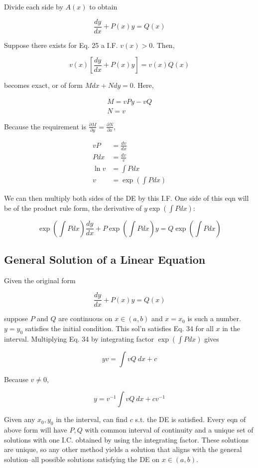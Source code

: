Divide each side by $A(x)$ to obtain

\begin{equation}
    \frac{dy}{dx}+P(x)y=Q(x)
\end{equation}

Suppose there exists for Eq. 25 a I.F. $v(x)>0$. Then,

\begin{equation}
    v(x)\left[\frac{dy}{dx}+P(x)y\right]=v(x)Q(x)
\end{equation}

becomes exact, or of form $Mdx+Ndy=0$. Here,

\begin{eqnarray}
    M=vPy-vQ\\
    N=v
\end{eqnarray}

Because the requirement is $\frac{\partial M}{\partial y}=\frac{\partial N}{\partial x}$,

\begin{align}
    vP&=\frac{dv}{dx}\\
    Pdx&=\frac{dv}{v}\\
    \ln v&=\int Pdx\\
    v&=\exp(\int Pdx)
\end{align}

We can then multiply both sides of the DE by this I.F. One side of this eqn will be of the product rule form, the derivative of $y\exp (\int Pdx)$:

\begin{equation}
    \exp(\int Pdx)\frac{dy}{dx}+P\exp(\int Pdx)y=Q\exp(\int Pdx)
\end{equation}

\subsection{General Solution of a Linear Equation}

Given the original form

\begin{equation}
    \frac{dy}{dx}+P(x)y=Q(x)
\end{equation}

suppose $P$ and $Q$ are continuous on $x\in (a,b)$ and $x=x_0$ is such a number. $y=y_0$ satisfies the initial condition.
This sol'n satisfies Eq. 34 for all $x$ in the interval. Multiplying Eq. 34 by integrating factor $\exp(\int Pdx)$ gives

\begin{equation}
    yv=\int vQ\:dx + c
\end{equation}

Because $v\neq 0$,

\begin{equation}
    y=v^{-1}\int vQ\: dx + cv^{-1}
\end{equation}

Given any $x_0,y_0$ in the interval, can find $c$ s.t. the DE is satisfied.
Every eqn of above form will have $P,Q$ with common interval of continuity and a unique set of solutions with one I.C. obtained by using the integrating factor.
These solutions are unique, so any other method yields a solution that aligns with the general solution–all possible solutions satisfying the DE on $x\in (a,b)$.